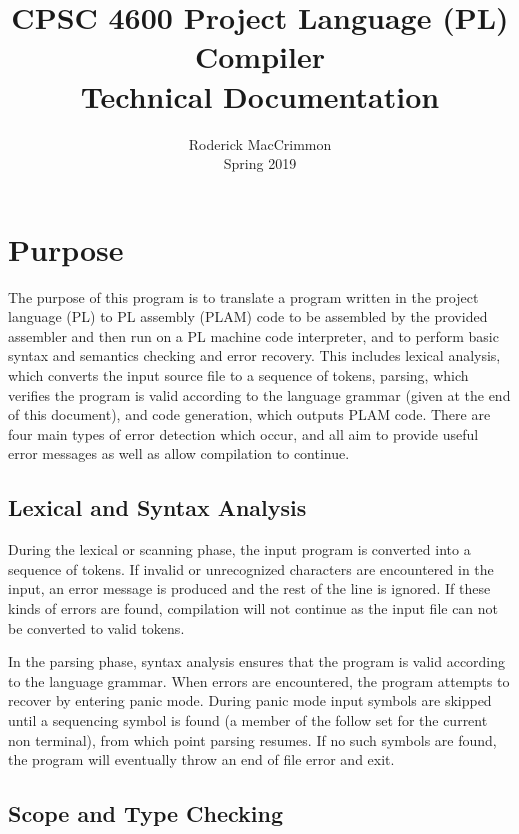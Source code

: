 \documentclass{article}
\begin{document}
\title{CPSC 4600 Project Language (PL) Compiler \\ \LARGE Technical Documentation}
\author{Roderick MacCrimmon \\ Spring 2019}
\date{}
\maketitle

\section{Purpose}

The purpose of this program is to translate a program written in the project language (PL) to PL assembly (PLAM) code to be assembled by the provided assembler and then run on a PL machine code interpreter, and to perform basic syntax and semantics checking and error recovery. This includes lexical analysis, which converts the input source file to a sequence of tokens, parsing, which verifies the program is valid according to the language grammar (given at the end of this document), and code generation, which outputs PLAM code. There are four main types of error detection which occur, and all aim to provide useful error messages as well as allow compilation to continue.

\subsection{Lexical and Syntax Analysis}

 During the lexical or scanning phase, the input program is converted into a sequence of tokens. If invalid or unrecognized characters are encountered in the input, an error message is produced and the rest of the line is ignored. If these kinds of errors are found, compilation will not continue as the input file can not be converted to valid tokens. 
 
 In the parsing phase, syntax analysis ensures that the program is valid according to the language grammar. When errors are encountered, the program attempts to recover by entering panic mode. During panic mode input symbols are skipped until a sequencing symbol is found (a member of the follow set for the current non terminal), from which point parsing resumes. If no such symbols are found, the program will eventually throw an end of file error and exit. 

\subsection{Scope and Type Checking}
\end{document}
